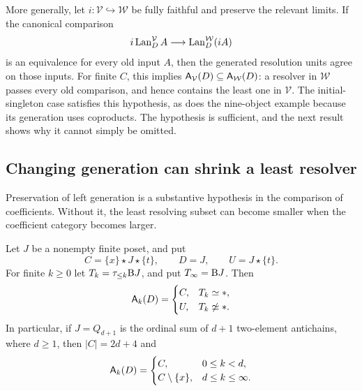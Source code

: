 More generally, let $i:\mathcal V\hookrightarrow\mathcal W$ be
fully faithful and preserve the relevant limits. If the canonical
comparison
\[
i\operatorname{Lan}_D^{\mathcal V} A\longrightarrow\operatorname{Lan}_D^{\mathcal W}(iA)
\]
is an equivalence for every old input $A$, then the generated resolution
units agree on those inputs. For finite $C$, this implies
$\mathsf A_{\mathcal V}(D)\subseteq\mathsf A_{\mathcal W}(D)$: a resolver in
$\mathcal W$ passes every old comparison, and hence contains the least
one in $\mathcal V$. The initial-singleton case satisfies this hypothesis,
as does the nine-object example because its generation uses coproducts.
The hypothesis is sufficient, and the next result shows why it cannot
simply be omitted.

\subsection{Changing generation can shrink a least resolver}
\label{sec:reversal}

Preservation of left generation is a substantive hypothesis in the
comparison of coefficients. Without it, the least resolving subset can
become smaller when the coefficient category becomes larger.

\begin{proposition}
\label{prop:reversal}
Let $J$ be a nonempty finite poset, and put
\[
C=\{x\}\star J\star\{t\},\qquad D=J,\qquad U=J\star\{t\}.
\]
For finite $k\geq0$ let $T_k=\tau_{\leq k}\mathrm B J$, and put
$T_\infty=\mathrm B J$. Then
\[
\mathsf A_k(D)=
\begin{cases}
C,&T_k\simeq *,\\
U,&T_k\not\simeq *.
\end{cases}
\]
In particular, if $J=Q_{d+1}$ is the ordinal sum of $d+1$
two-element antichains, where $d\geq1$, then $|C|=2d+4$ and
\[
\mathsf A_k(D)=
\begin{cases}
C,&0\leq k<d,\\
C\setminus\{x\},&d\leq k\leq\infty.
\end{cases}
\]
\end{proposition}

